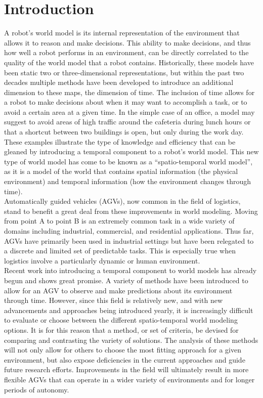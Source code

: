 

  \chapter{ Introduction }

  A robot's world model is its internal representation of the environment that
  allows it to reason and make decisions. This ability to make decisions, and
  thus how well a robot performs in an environment, can be directly correlated
  to the quality of the world model that a robot contains. Historically, these models
  have been static two or three-dimensional representations, but within the past
  two decades multiple methods have been developed to introduce an additional
  dimension to these maps, the dimension of time. The inclusion of time allows
  for a robot to make decisions about when it may want to accomplish a task, or
  to avoid a certain area at a given time. In the simple case of an
  office, a model may suggest to avoid areas of high traffic around the cafeteria
  during lunch hours or that a shortcut between two buildings is open, but only
  during the work day. These examples illustrate the type of knowledge and
  efficiency that can be gleaned by introducing a temporal component to a robot's
  world model. This new type of world model has come to be known as a
  ``spatio-temporal world model'', as it is a model of the world that contains
  spatial information (the physical environment) and temporal
  information (how the environment changes through time).\\

  Automatically guided vehicles (AGVs), now common in the field of logistics,
  stand to benefit a great deal from these improvements in world modeling.
  Moving from point A to point B is an extremely common task in a wide
  variety of domains including industrial, commercial, and residential
  applications. Thus far, AGVs have primarily been used in industrial settings
  but have been relegated to a discrete and limited set
  of predictable tasks. This is especially true when logistics involve a
  particularly dynamic or human environment. \\

  Recent work into introducing a temporal component to world models has
  already begun and shows great promise. A variety of methods have been
  introduced to allow for an AGV to observe and make predictions about its
  environment through time. However, since this field is relatively new, and
  with new advancements and approaches being introduced yearly, it is
  increasingly difficult to evaluate or choose between the
  different spatio-temporal world modeling options. It is for this reason that a
  method, or set of criteria, be devised for comparing and contrasting the
  variety of solutions. The analysis of these methods will not only allow for
  others to choose the most fitting approach for a given environment, but also
  expose deficiencies in the current approaches and guide future research
  efforts. Improvements in the field will ultimately result in more flexible
  AGVs that can operate in a wider variety of environments and for longer
  periods of autonomy. \\


